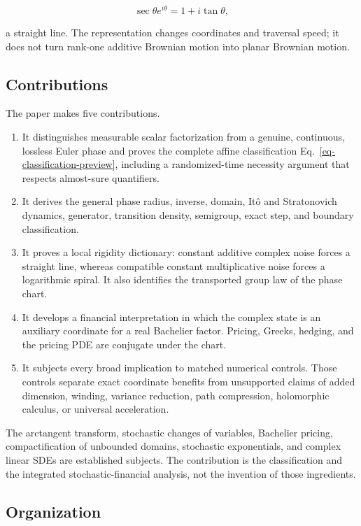 \documentclass[
  english,
  10pt,
  letterpaper,
  DIV=11,
  numbers=noendperiod]{scrartcl}
\providecommand{\tightlist}{%
  \setlength{\itemsep}{0pt}\setlength{\parskip}{0pt}}
\theoremstyle{definition}
\theoremstyle{plain}
\theoremstyle{plain}
\theoremstyle{remark}
\begin{document}
\[
\sec\theta e^{i\theta}=1+i\tan\theta,
\]

a straight line. The representation changes coordinates and traversal
speed; it does not turn rank-one additive Brownian motion into planar
Brownian motion.

\subsection{Contributions}\label{contributions}

The paper makes five contributions.

\begin{enumerate}
\def\labelenumi{\arabic{enumi}.}
\tightlist
\item
  It distinguishes measurable scalar factorization from a genuine,
  continuous, lossless Euler phase and proves the complete affine
  classification Eq.~\ref{eq-classification-preview}, including a
  randomized-time necessity argument that respects almost-sure
  quantifiers.
\item
  It derives the general phase radius, inverse, domain, Itô and
  Stratonovich dynamics, generator, transition density, semigroup, exact
  step, and boundary classification.
\item
  It proves a local rigidity dictionary: constant additive complex noise
  forces a straight line, whereas compatible constant multiplicative
  noise forces a logarithmic spiral. It also identifies the transported
  group law of the phase chart.
\item
  It develops a financial interpretation in which the complex state is
  an auxiliary coordinate for a real Bachelier factor. Pricing, Greeks,
  hedging, and the pricing PDE are conjugate under the chart.
\item
  It subjects every broad implication to matched numerical controls.
  Those controls separate exact coordinate benefits from unsupported
  claims of added dimension, winding, variance reduction, path
  compression, holomorphic calculus, or universal acceleration.
\end{enumerate}

The arctangent transform, stochastic changes of variables, Bachelier
pricing, compactification of unbounded domains, stochastic exponentials,
and complex linear SDEs are established subjects. The contribution is
the classification and the integrated stochastic-financial analysis, not
the invention of those ingredients.

\subsection{Organization}\label{organization}
\end{document}
